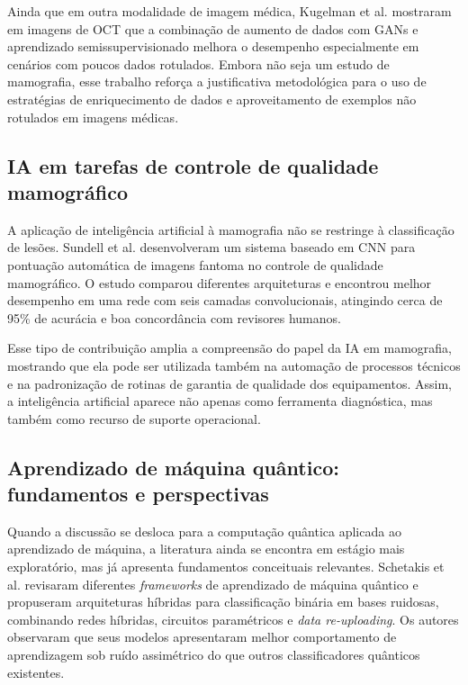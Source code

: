 Ainda que em outra modalidade de imagem médica, Kugelman et al. \cite{kugelman2024} mostraram em imagens de OCT que a combinação de aumento de dados com GANs e aprendizado semissupervisionado melhora o desempenho especialmente em cenários com poucos dados rotulados. Embora não seja um estudo de mamografia, esse trabalho reforça a justificativa metodológica para o uso de estratégias de enriquecimento de dados e aproveitamento de exemplos não rotulados em imagens médicas.

\subsection{IA em tarefas de controle de qualidade mamográfico}

A aplicação de inteligência artificial à mamografia não se restringe à classificação de lesões. Sundell et al. \cite{sundell2022} desenvolveram um sistema baseado em CNN para pontuação automática de imagens fantoma no controle de qualidade mamográfico. O estudo comparou diferentes arquiteturas e encontrou melhor desempenho em uma rede com seis camadas convolucionais, atingindo cerca de 95\% de acurácia e boa concordância com revisores humanos.

Esse tipo de contribuição amplia a compreensão do papel da IA em mamografia, mostrando que ela pode ser utilizada também na automação de processos técnicos e na padronização de rotinas de garantia de qualidade dos equipamentos. Assim, a inteligência artificial aparece não apenas como ferramenta diagnóstica, mas também como recurso de suporte operacional.

\subsection{Aprendizado de máquina quântico: fundamentos e perspectivas}

Quando a discussão se desloca para a computação quântica aplicada ao aprendizado de máquina, a literatura ainda se encontra em estágio mais exploratório, mas já apresenta fundamentos conceituais relevantes. Schetakis et al. \cite{schetakis2022} revisaram diferentes \textit{frameworks} de aprendizado de máquina quântico e propuseram arquiteturas híbridas para classificação binária em bases ruidosas, combinando redes híbridas, circuitos paramétricos e \textit{data re-uploading}. Os autores observaram que seus modelos apresentaram melhor comportamento de aprendizagem sob ruído assimétrico do que outros classificadores quânticos existentes.

